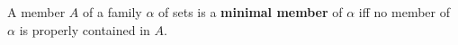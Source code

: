 A member $A$ of a family $\alpha$ of sets is a \textbf{minimal member} of $\alpha$ iff no member of $\alpha$ is properly contained in $A$.

